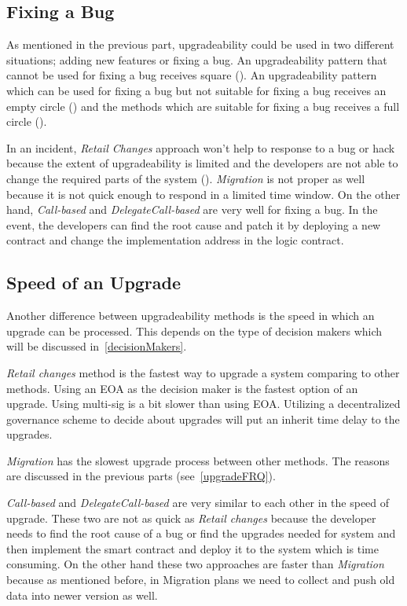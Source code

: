  \subsection{Fixing a Bug}
 
As mentioned in the previous part, upgradeability could be used in two different situations; adding new features or fixing a bug. An upgradeability pattern that cannot be used for fixing a bug receives square (\XBox). An upgradeability pattern which can be used for fixing a bug but not suitable for fixing a bug receives an empty circle (\Circle) and the methods which are suitable for fixing a bug receives a full circle (\CIRCLE).

In an incident, \textit{Retail Changes} approach won't help to response to a bug or hack because the extent of upgradeability is limited and the developers are not able to change the required parts of the system (\XBox). \textit{Migration} is not proper as well because it is not quick enough to respond in a limited time window.
On the other hand, \textit{Call-based} and \textit{DelegateCall-based} are very well for fixing a bug. In the event, the developers can find the root cause and patch it by deploying a new contract and change the implementation address in the logic contract. 

 \subsection{Speed of an Upgrade}
 
Another difference between upgradeability methods is the speed in which an upgrade can be processed. This depends on the type of decision makers which will be discussed in~\ref{decisionMakers}. 

\textit{Retail changes} method is the fastest way to upgrade a system comparing to other methods. Using an EOA as the decision maker is the fastest option of an upgrade. Using multi-sig is a bit slower than using EOA. Utilizing a decentralized governance scheme to decide about upgrades will put an inherit time delay to the upgrades.

\textit{Migration} has the slowest upgrade process between other methods. The reasons are discussed in the previous parts (see~\ref{upgradeFRQ}).

\textit{Call-based} and \textit{DelegateCall-based} are very similar to each other in the speed of upgrade. These two are not as quick as \textit{Retail changes} because the developer needs to find the root cause of a bug or find the upgrades needed for system and then implement the smart contract and deploy it to the system which is time consuming.
On the other hand these two approaches are faster than \textit{Migration} because as mentioned before, in Migration plans we need to collect and push old data into newer version as well.  

